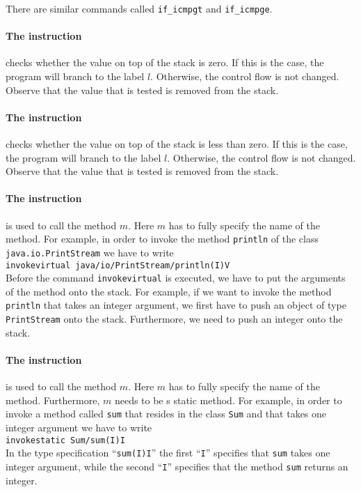 There are similar commands called \texttt{if\_icmpgt} and \texttt{if\_icmpge}.

\paragraph{The instruction }
checks whether the value on top of the stack is zero.  If this is the case, the program will branch
to the label $l$.  Otherwise, the control flow is not changed.  Observe that the value that is
tested is removed from the stack.


\paragraph{The instruction }
checks whether the value on top of the stack is less than zero.  If this is the case, the program
will branch to the label $l$.  Otherwise, the control flow is not changed.  Observe that the value
that is tested is removed from the stack.


\paragraph{The instruction }
is used to call the method $m$.  Here $m$ has to fully specify the name of the method.
For example, in order to invoke the method \texttt{println} of the class
\texttt{java.io.PrintStream} we have to write 
\\[0.2cm]
\hspace*{1.3cm}
\texttt{invokevirtual java/io/PrintStream/println(I)V}
\\[0.2cm]
Before the command \texttt{invokevirtual} is executed, we have to put the arguments of the method
onto the stack.  For example, if we want to invoke the method \texttt{println} that takes an integer
argument, we first have to push an object of type \texttt{PrintStream} onto the stack.  Furthermore,
we need to push an integer onto the stack.

\paragraph{The instruction }
is used to call the method $m$.  Here $m$ has to fully specify the name of the method.
Furthermore, $m$ needs to be s static method.
For example, in order to invoke a  method called \texttt{sum} that resides in the class \texttt{Sum}
and that takes one integer argument we have to write 
\\[0.2cm]
\hspace*{1.3cm}
\texttt{invokestatic  Sum/sum(I)I}
\\[0.2cm]
In the type specification ``\texttt{sum(I)I}'' the first ``\texttt{I}'' specifies that \texttt{sum}
takes one integer argument, while the second ``\texttt{I}'' specifies that the method \texttt{sum}
returns an integer.

